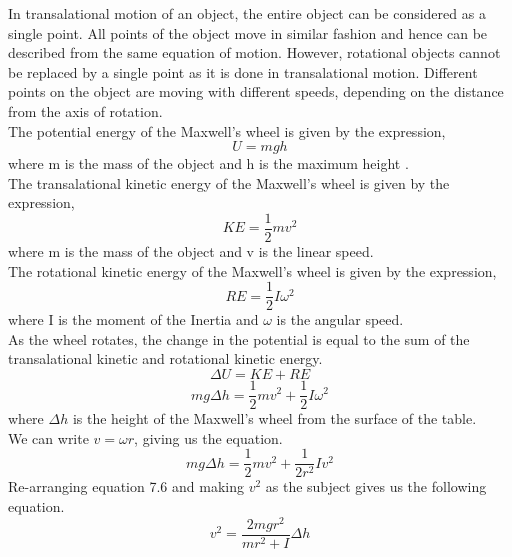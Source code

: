 In transalational motion of an object, the entire object can be considered as a single point. All points of the object move in similar fashion and hence can be described from the same equation  of motion.  
However, rotational objects cannot be replaced by a single point as it is done in transalational motion.
Different points on the object are moving with different  speeds, depending on the distance from the axis of rotation. \\
The potential energy of the Maxwell's wheel is given by the expression,
\begin{equation}
    U =  mgh
\end{equation}
where m is the mass of the object and h is the maximum height . \\
The transalational kinetic energy of the Maxwell's wheel is given by the expression,
\begin{equation}
    KE =  \frac{1}{2}mv^2
\end{equation}
where m is the mass of the object and  v is the linear speed.\\
The rotational kinetic energy of the Maxwell's wheel is given by the expression,
\begin{equation}
    RE =  \frac{1}{2}I\omega^2
\end{equation}
where I is the moment of the Inertia and  $\omega$ is the angular speed.\\
As the wheel rotates, the change in the potential is equal to the sum of the transalational kinetic and rotational kinetic energy.
\begin{equation}
    \Delta U = KE + RE
\end{equation}
\begin{equation}
    mg\Delta h = \frac{1}{2}mv^2  + \frac{1}{2}I\omega^2
\end{equation}
where  $\Delta h$ is the height of the Maxwell's wheel from the surface of the table. \\
We can write $v = \omega r$, giving us the equation. 
\begin{equation}
    mg\Delta h = \frac{1}{2}mv^2  + \frac{1} { 2 r ^2}I v ^  2
\end{equation}
Re-arranging equation 7.6 and making $v^2$ as the subject gives us the following equation.
\begin{equation}
    v^2 = \frac{2mgr^2}{mr^2 + I} \Delta h
\end{equation}
\newpage
